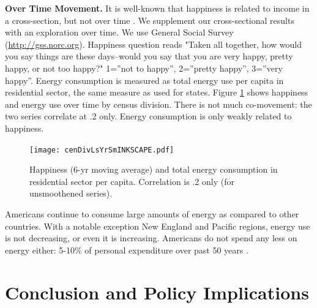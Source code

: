 \documentclass[10pt, letterpaper]{article}
\begin{document}
\begin{spacing}{1.5}
{\bf Over Time Movement.} It is well-known that happiness is related to income
in  a 
cross-section, but not over time \citep{easterlin74,easterlin12}. We
supplement our cross-sectional results with an exploration over time. We use General
Social Survey (\url{http://gss.norc.org}).   %
Happiness question reads "Taken all together, how would you say things are
      these days--would you say that you are very happy, pretty happy, or not
      too happy?" 1=''not to happy'', 2=''pretty happy'', 3=''very happy''. 
 Energy consumption is measured as total energy use per capita in
residential sector, the same measure as used for states. 
Figure \ref{cenDivLsYrSm} shows happiness and energy use over time by
census division. There is not much co-movement: the two series correlate at
.2 only. Energy consumption is only weakly related to happiness. 

\begin{figure}[H]
 \texttt{[image: cenDivLsYrSmINKSCAPE.pdf]}\centering
\caption{Happiness (6-yr moving average) and total energy consumption
  in residential sector per capita. Correlation is .2 only (for unsmoothened series).
}\label{cenDivLsYrSm}
\end{figure}

Americans continue to consume large amounts of energy as compared to other
countries.  With a notable exception New England and Pacific regions, energy use
is not decreasing, or even it is increasing. %
 Americans do not spend any less  on energy either: 5-10\% of personal
expenditure over past 50 years %
 \citep{bea-2-8-5}.


\section*{\large \bf Conclusion and Policy Implications} %


\end{spacing}
\end{document}
